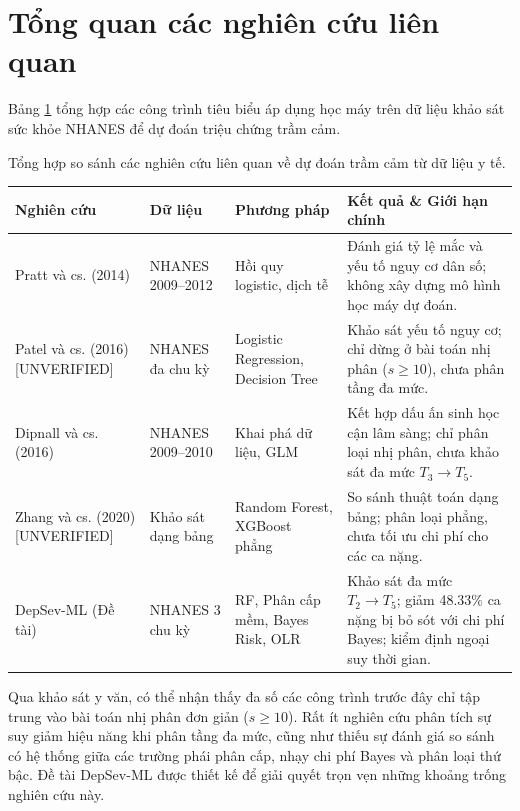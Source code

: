 \section{Tổng quan các nghiên cứu liên quan}
\label{sec:nghien-cuu-lien-quan}

Bảng \ref{tab:related-works} tổng hợp các công trình tiêu biểu áp dụng học máy trên dữ liệu khảo sát sức khỏe NHANES để dự đoán triệu chứng trầm cảm.

\begin{table}[htbp]{Tổng hợp so sánh các nghiên cứu liên quan về dự đoán trầm cảm từ dữ liệu y tế.}
\centering
\small
\setlength{\tabcolsep}{4pt}
\label{tab:related-works}
\begin{tabularx}{\textwidth}{p{3.0cm} p{2.2cm} p{3.4cm} X}
\toprule
\textbf{Nghiên cứu} & \textbf{Dữ liệu} & \textbf{Phương pháp} & \textbf{Kết quả \& Giới hạn chính} \\
\midrule
Pratt và cs. (2014) \cite{pratt2014depression} & NHANES 2009--2012 & Hồi quy logistic, dịch tễ & Đánh giá tỷ lệ mắc và yếu tố nguy cơ dân số; không xây dựng mô hình học máy dự đoán. \\
\midrule
Patel và cs. (2016) \cite{patel2016systematic} [UNVERIFIED] & NHANES đa chu kỳ & Logistic Regression, Decision Tree & Khảo sát yếu tố nguy cơ; chỉ dừng ở bài toán nhị phân ($s \ge 10$), chưa phân tầng đa mức. \\
\midrule
Dipnall và cs. (2016) \cite{dipnall2016fusing} & NHANES 2009--2010 & Khai phá dữ liệu, GLM & Kết hợp dấu ấn sinh học cận lâm sàng; chỉ phân loại nhị phân, chưa khảo sát đa mức $T_3 \to T_5$. \\
\midrule
Zhang và cs. (2020) \cite{zhang2020machine} [UNVERIFIED] & Khảo sát dạng bảng & Random Forest, XGBoost phẳng & So sánh thuật toán dạng bảng; phân loại phẳng, chưa tối ưu chi phí cho các ca nặng. \\
\midrule
DepSev-ML (Đề tài) & NHANES 3 chu kỳ & RF, Phân cấp mềm, Bayes Risk, OLR & Khảo sát đa mức $T_2 \to T_5$; giảm 48.33\% ca nặng bị bỏ sót với chi phí Bayes; kiểm định ngoại suy thời gian. \\
\bottomrule
\end{tabularx}
\end{table}

Qua khảo sát y văn, có thể nhận thấy đa số các công trình trước đây chỉ tập trung vào bài toán nhị phân đơn giản ($s \ge 10$). Rất ít nghiên cứu phân tích sự suy giảm hiệu năng khi phân tầng đa mức, cũng như thiếu sự đánh giá so sánh có hệ thống giữa các trường phái phân cấp, nhạy chi phí Bayes và phân loại thứ bậc. Đề tài DepSev-ML được thiết kế để giải quyết trọn vẹn những khoảng trống nghiên cứu này.
